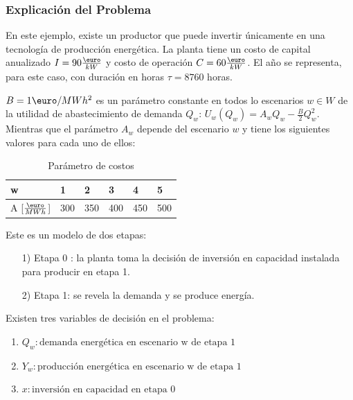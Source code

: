 \subsubsection{Explicación del Problema}

En este ejemplo, existe un productor que puede invertir únicamente en una tecnología de producción energética. La planta tiene un costo de capital anualizado $I=90 \frac{\textup{\euro}}{kW}$ y costo de operación $C=60 \frac{\textup{\euro}}{kW}$. El año se representa, para este caso, con duración en horas $\tau = 8760$ horas. 
\vspace{2.5mm}

$B = 1\textup{\euro}/MWh^2$ es un parámetro constante en todos lo escenarios $w \in W$ de la utilidad de abastecimiento de demanda $Q_w$: $U_w(Q_w) = A_wQ_w-\frac{B}{2}Q_w^2$. Mientras que el parámetro $A_w$ depende del escenario $w$ y tiene los siguientes valores para cada uno de ellos:

\begin{table}[H]
\centering
\begin{tabular}{|l|l|l|l|l|l|}
\hline
\textbf{w} & \textbf{1} & \textbf{2} & 3 & 4 & 5 \\ \hline
A {[$\frac{\textup{\euro}}{MWh}$]} & 300 & 350 & 400 & 450 & 500 \\ \hline
\end{tabular}
\caption{Parámetro de costos}
\end{table}

\vspace{2.5mm}

Este es un modelo de dos etapas:
\begin{enumerate}
    \item[1)] Etapa 0 : la planta toma la decisión de inversión en capacidad instalada para producir en etapa 1.
    \item[2)] Etapa 1: se revela la demanda y se produce energía.
\end{enumerate}

Existen tres variables de decisión en el problema:
\vspace{2.5mm}
\begin{enumerate}
    \item $Q_w: \text{demanda energética en escenario w de etapa 1}$
    \item $Y_w: \text{producción energética en escenario w de etapa 1}$
    \item $x: \text{inversión en capacidad en etapa 0}$
\end{enumerate}

